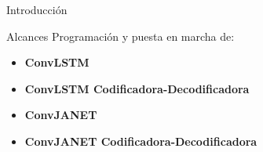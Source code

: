\begin{frame}{Introducción}
\begin{block}{Alcances}
Programación y puesta en marcha de:


\begin{itemize}
    \item \textbf{ConvLSTM} 
    \item \textbf{ConvLSTM Codificadora-Decodificadora}
    \pause
    \item \textbf{ConvJANET} 
    \item \textbf{ConvJANET Codificadora-Decodificadora} 
\end{itemize}

\end{block}
   
\end{frame}
